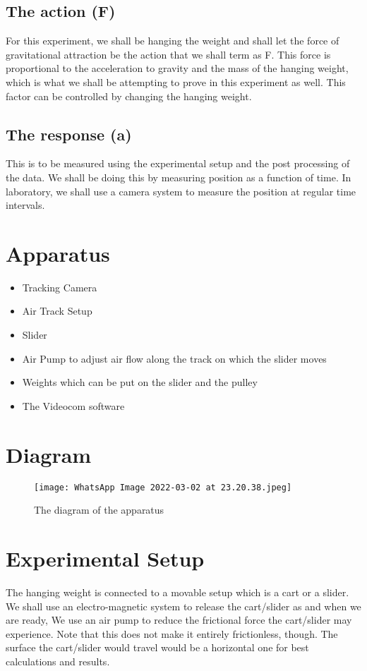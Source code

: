 \documentclass[12pt, letterpaper]{article}
\begin{document}
\subsection{The action (F)}
For this experiment, we shall be hanging the weight and shall let the force of gravitational attraction be the action that we shall term as F. This force is proportional to the acceleration to gravity and the mass of the hanging weight, which is what we shall be attempting to prove in this experiment as well.
This factor can be controlled by changing the hanging weight.

\subsection{The response (a)}
This is to be measured using the experimental setup and the post processing of the data. We shall be doing this by measuring position as a function of time. In laboratory, we shall use a camera system to measure the position at regular time intervals.

\vspace{3cm}

\section{Apparatus}
\begin{itemize}
    \item  Tracking Camera
    \item Air Track Setup
    \item Slider
    \item Air Pump to adjust air flow
along the track on which the slider moves
    \item Weights which can be put on the slider and the
pulley
    \item The Videocom software
\end{itemize}

\section{Diagram}
\begin{figure}[h]
    \centering
    \texttt{[image: WhatsApp Image 2022-03-02 at 23.20.38.jpeg]}
    \caption{The diagram of the apparatus}
    \label{fig:fig1}
\end{figure}

\vspace{2cm}

\section{Experimental Setup}
The hanging weight is connected to a movable setup which is a cart or a slider. We shall use an electro-magnetic system to release the cart/slider as and when we are ready, We use an air pump to reduce the frictional force the cart/slider may experience. Note that this does not make it entirely frictionless, though. The surface the cart/slider would travel would be a horizontal one for best calculations and results.
\end{document}
